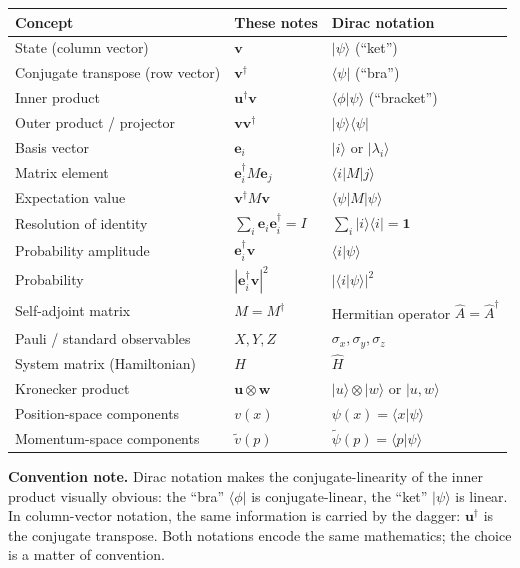 \documentclass[12pt,a4paper]{article}
\begin{document}
\medskip
\begin{center}
\renewcommand{\arraystretch}{1.3}
\begin{tabular}{@{}lll@{}}
\toprule
\textbf{Concept} & \textbf{These notes} & \textbf{Dirac notation} \\
\midrule
State (column vector) & $\mathbf{v}$ & $|\psi\rangle$ (``ket'') \\
Conjugate transpose (row vector) & $\mathbf{v}^\dagger$ & $\langle\psi|$ (``bra'') \\
Inner product & $\mathbf{u}^\dagger\mathbf{v}$ & $\langle\phi|\psi\rangle$ (``bracket'') \\
Outer product / projector & $\mathbf{v}\mathbf{v}^\dagger$ & $|\psi\rangle\langle\psi|$ \\
Basis vector & $\mathbf{e}_i$ & $|i\rangle$ or $|\lambda_i\rangle$ \\
Matrix element & $\mathbf{e}_i^\dagger M\mathbf{e}_j$ & $\langle i|M|j\rangle$ \\
Expectation value & $\mathbf{v}^\dagger M\mathbf{v}$ & $\langle\psi|M|\psi\rangle$ \\
Resolution of identity & $\sum_i \mathbf{e}_i\mathbf{e}_i^\dagger = I$ & $\sum_i |i\rangle\langle i| = \mathbf{1}$ \\
Probability amplitude & $\mathbf{e}_i^\dagger\mathbf{v}$ & $\langle i|\psi\rangle$ \\
Probability & $|\mathbf{e}_i^\dagger\mathbf{v}|^2$ & $|\langle i|\psi\rangle|^2$ \\
Self-adjoint matrix & $M = M^\dagger$ & Hermitian operator $\hat{A} = \hat{A}^\dagger$ \\
Pauli / standard observables & $X, Y, Z$ & $\sigma_x, \sigma_y, \sigma_z$ \\
System matrix (Hamiltonian) & $H$ & $\hat{H}$ \\
Kronecker product & $\mathbf{u} \otimes \mathbf{w}$ & $|u\rangle \otimes |w\rangle$ or $|u,w\rangle$ \\
Position-space components & $v(x)$ & $\psi(x) = \langle x|\psi\rangle$ \\
Momentum-space components & $\tilde{v}(p)$ & $\tilde{\psi}(p) = \langle p|\psi\rangle$ \\
\bottomrule
\end{tabular}
\end{center}

\medskip
\noindent\textbf{Convention note.}  Dirac notation makes the conjugate-linearity of the inner product visually obvious: the ``bra'' $\langle\phi|$ is conjugate-linear, the ``ket'' $|\psi\rangle$ is linear.  In column-vector notation, the same information is carried by the dagger: $\mathbf{u}^\dagger$ is the conjugate transpose.  Both notations encode the same mathematics; the choice is a matter of convention.
\end{document}
